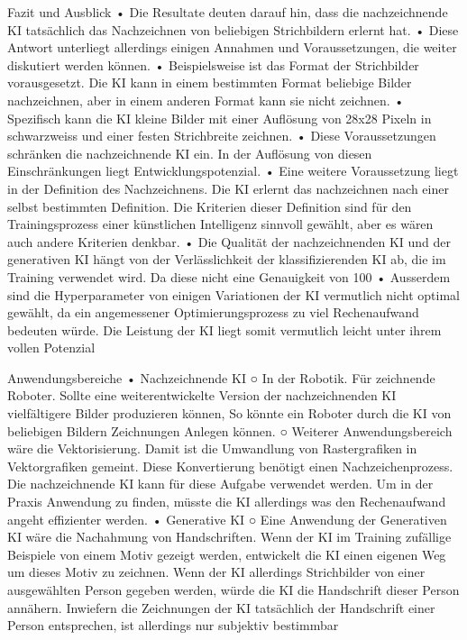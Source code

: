 Fazit und Ausblick 
	• Die Resultate deuten darauf hin, dass die nachzeichnende KI tatsächlich das Nachzeichnen von beliebigen Strichbildern erlernt hat. 
	• Diese Antwort unterliegt allerdings einigen Annahmen und Voraussetzungen, die weiter diskutiert werden können.
	• Beispielsweise ist das Format der Strichbilder vorausgesetzt. Die KI kann in einem bestimmten Format beliebige Bilder nachzeichnen, aber in einem anderen Format kann sie nicht zeichnen.
	• Spezifisch kann die KI kleine Bilder mit einer Auflösung von 28x28 Pixeln in schwarzweiss und einer festen Strichbreite zeichnen. 
	• Diese Voraussetzungen schränken die nachzeichnende KI ein. In der Auflösung von diesen Einschränkungen liegt Entwicklungspotenzial.
	• Eine weitere Voraussetzung liegt in der Definition des Nachzeichnens. Die KI erlernt das nachzeichnen nach einer selbst bestimmten Definition. Die Kriterien dieser Definition sind für den Trainingsprozess einer künstlichen Intelligenz sinnvoll gewählt, aber es wären auch andere Kriterien denkbar.
	• Die Qualität der nachzeichnenden KI und der generativen KI hängt von der Verlässlichkeit der klassifizierenden KI ab, die im Training verwendet wird. Da diese nicht eine Genauigkeit von 100%
	• Ausserdem sind die Hyperparameter von einigen Variationen der KI vermutlich nicht optimal gewählt, da ein angemessener Optimierungsprozess zu viel Rechenaufwand bedeuten würde. Die Leistung der KI liegt somit vermutlich leicht unter ihrem vollen Potenzial
	

Anwendungsbereiche
	• Nachzeichnende KI
		○ In der Robotik. Für zeichnende Roboter. Sollte eine weiterentwickelte Version der nachzeichnenden KI vielfältigere Bilder produzieren können, So könnte ein Roboter durch die KI von beliebigen Bildern Zeichnungen Anlegen können.
		○ Weiterer Anwendungsbereich wäre die Vektorisierung. Damit ist die Umwandlung von Rastergrafiken in Vektorgrafiken gemeint. Diese Konvertierung benötigt einen Nachzeichenprozess. Die nachzeichnende KI kann für diese Aufgabe verwendet werden. Um in der Praxis Anwendung zu finden, müsste die KI allerdings was den Rechenaufwand angeht effizienter werden.
	• Generative KI
		○ Eine Anwendung der Generativen KI wäre die Nachahmung von Handschriften. Wenn der KI im Training zufällige Beispiele von einem Motiv gezeigt werden, entwickelt die KI einen eigenen Weg um dieses Motiv zu zeichnen. Wenn der KI allerdings Strichbilder von einer ausgewählten Person gegeben werden, würde die KI die Handschrift dieser Person annähern. Inwiefern die Zeichnungen der KI tatsächlich der Handschrift einer Person entsprechen, ist allerdings nur subjektiv bestimmbar 

